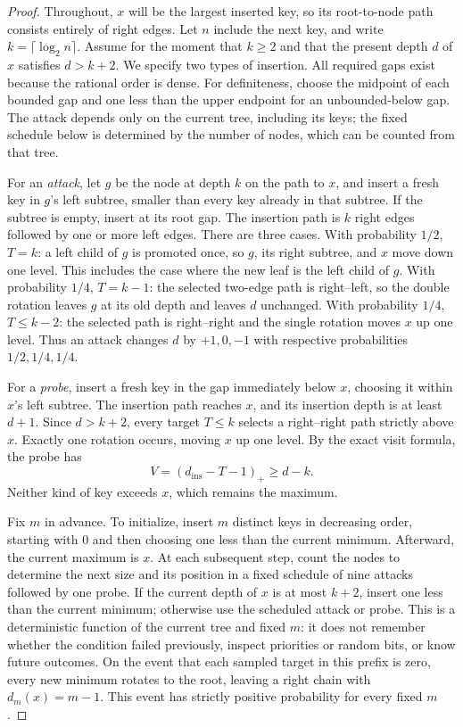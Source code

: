 \begin{proof}
Throughout, $x$ will be the largest inserted key, so its root-to-node path
consists entirely of right edges. Let $n$ include the next key, and write
$k=\lceil\log_2 n\rceil$. Assume for the moment that $k\geq2$ and that the
present depth $d$ of $x$ satisfies $d>k+2$. We specify two types of insertion.
All required gaps exist because the rational order is dense.
For definiteness, choose the midpoint of each bounded gap and one less than
the upper endpoint for an unbounded-below gap. The attack depends only on the
current tree, including its keys; the fixed schedule below is determined by
the number of nodes, which can be counted from that tree.

For an \emph{attack}, let $g$ be the node at depth $k$ on the path to $x$,
and insert a fresh key in $g$'s left subtree, smaller than every key already
in that subtree. If the subtree is empty, insert at its root gap. The insertion
path is $k$ right edges followed by one or more left edges. There are three
cases. With probability $1/2$, $T=k$: a left child of $g$ is promoted once,
so $g$, its right subtree, and $x$ move down one level. This includes the
case where the new leaf is the left child of $g$. With probability $1/4$,
$T=k-1$: the selected two-edge path is right--left, so the double rotation
leaves $g$ at its old depth and leaves $d$ unchanged. With probability $1/4$,
$T\leq k-2$: the selected path is right--right and the single rotation moves
$x$ up one level. Thus an attack changes $d$ by $+1,0,-1$ with respective
probabilities $1/2,1/4,1/4$.

For a \emph{probe}, insert a fresh key in the gap immediately below $x$,
choosing it within $x$'s left subtree. The insertion path reaches $x$, and
its insertion depth is at least $d+1$. Since $d>k+2$, every target $T\leq k$
selects a right--right path strictly above $x$. Exactly one rotation occurs,
moving $x$ up one level. By the exact visit formula, the probe has
\[ V=(d_{\mathrm{ins}}-T-1)_+\geq d-k. \]
Neither kind of key exceeds $x$, which remains the maximum.

Fix $m$ in advance. To initialize, insert $m$ distinct keys in decreasing
order, starting with $0$ and then choosing one less than the current minimum.
Afterward, the current maximum is $x$. At each subsequent step, count the
nodes to determine the next size and its position in a fixed schedule of nine
attacks followed by one probe. If the current depth of $x$ is at most $k+2$,
insert one less than the current minimum; otherwise use the scheduled attack
or probe. This is a deterministic function of the current tree and fixed $m$:
it does not remember whether the condition failed previously, inspect priorities
or random bits, or know future outcomes. On the event that
each sampled target in this prefix is zero, every new minimum rotates to the
root, leaving a right chain with $d_m(x)=m-1$. This event has strictly positive
probability for every fixed $m$.


\end{proof}
